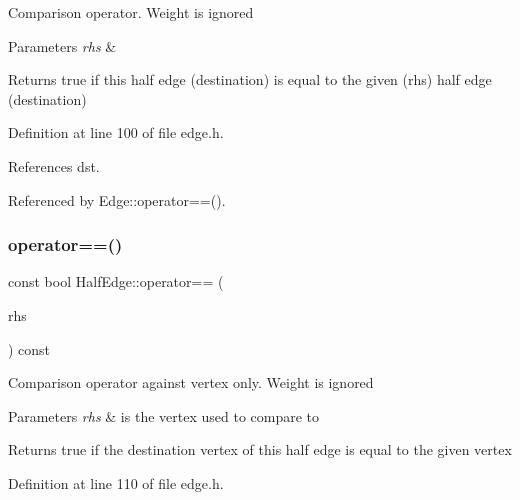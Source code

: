Comparison operator. Weight is ignored 
\begin{DoxyParams}{Parameters}
{\em rhs} & \\
\hline
\end{DoxyParams}
\begin{DoxyReturn}{Returns}
true if this half edge (destination) is equal to the given (rhs) half edge (destination) 
\end{DoxyReturn}


Definition at line 100 of file edge.\+h.



References dst.



Referenced by Edge\+::operator==().

\mbox{\label{classHalfEdge_a3bdd3ac1c21afdb400d8afbc0047d3bb}} 
\subsubsection{\texorpdfstring{operator==()}{operator==()}\hspace{0.1cm}{\footnotesize\ttfamily [2/2]}}
{\footnotesize\ttfamily const bool Half\+Edge\+::operator== (\begin{DoxyParamCaption}\item[{const \hyperlink{edge_8h_a5fbd20c46956d479cb10afc9855223f6}{type\+Vertex} \&}]{rhs }\end{DoxyParamCaption}) const\hspace{0.3cm}{\ttfamily [inline]}}

Comparison operator against vertex only. Weight is ignored 
\begin{DoxyParams}{Parameters}
{\em rhs} & is the vertex used to compare to \\
\hline
\end{DoxyParams}
\begin{DoxyReturn}{Returns}
true if the destination vertex of this half edge is equal to the given vertex 
\end{DoxyReturn}


Definition at line 110 of file edge.\+h.

\mbox{\label{classHalfEdge_a404d99fef10c73f149fec5f87ca18958}} 
